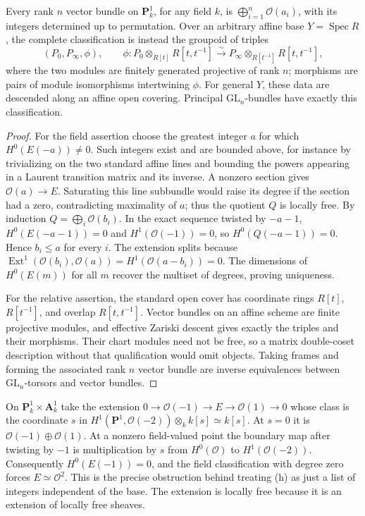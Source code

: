 \begin{theorem}
\label{geo-Kh}
Every rank $n$ vector bundle on $\mathbf P^1_k$, for any field $k$, is
$\bigoplus_{i=1}^n\mathcal O(a_i)$, with its integers determined up to
permutation. Over an arbitrary affine base $Y=\operatorname{Spec}R$,
the complete classification is instead the groupoid of triples
\[
 (P_0,P_\infty,\phi),\qquad
 \phi:P_0\otimes_{R[t]}R[t,t^{-1}]
 \xrightarrow{\sim}P_\infty\otimes_{R[t^{-1}]}R[t,t^{-1}],
\]
where the two modules are finitely generated projective of rank $n$;
morphisms are pairs of module isomorphisms intertwining $\phi$.
For general $Y$, these data are descended along an affine open covering.
Principal $\mathrm{GL}_n$-bundles have exactly this classification.
\end{theorem}
\begin{proof}
For the field assertion choose the greatest integer $a$ for which
$H^0(E(-a))\ne0$. Such integers exist and are bounded above, for instance
by trivializing on the two standard affine lines and bounding the powers
appearing in a Laurent transition matrix and its inverse. A nonzero
section gives $\mathcal O(a)\to E$. Saturating this line subbundle would
raise its degree if the section had a zero, contradicting maximality of
$a$; thus the quotient $Q$ is locally free. By induction
$Q=\bigoplus_i\mathcal O(b_i)$. In the exact sequence twisted by $-a-1$,
$H^0(E(-a-1))=0$ and $H^1(\mathcal O(-1))=0$, so
$H^0(Q(-a-1))=0$. Hence $b_i\leq a$ for every $i$.
The extension splits because
$\operatorname{Ext}^1(\mathcal O(b_i),\mathcal O(a))
=H^1(\mathcal O(a-b_i))=0$. The dimensions of $H^0(E(m))$ for all $m$
recover the multiset of degrees, proving uniqueness.

For the relative assertion, the standard open cover has coordinate rings
$R[t]$, $R[t^{-1}]$, and overlap $R[t,t^{-1}]$. Vector bundles on an affine
scheme are finite projective modules, and effective Zariski descent gives
exactly the triples and their morphisms. Their chart modules need not be
free, so a matrix double-coset description without that qualification would
omit objects. Taking frames and forming the associated rank $n$ vector
bundle are inverse equivalences between $\mathrm{GL}_n$-torsors and
vector bundles.
\end{proof}

\begin{example}
\label{geo-Kh-jump}
On $\mathbf P^1_k\times\mathbf A^1_k$ take the extension
$0\to\mathcal O(-1)\to E\to\mathcal O(1)\to0$
whose class is the coordinate $s$ in
$H^1(\mathbf P^1,\mathcal O(-2))\otimes_k k[s]\simeq k[s]$.
At $s=0$ it is $\mathcal O(-1)\oplus\mathcal O(1)$.
At a nonzero field-valued point the boundary map after twisting by $-1$
is multiplication by $s$ from $H^0(\mathcal O)$ to
$H^1(\mathcal O(-2))$. Consequently $H^0(E(-1))=0$, and the field
classification with degree zero forces $E\simeq\mathcal O^2$.
This is the precise obstruction behind treating (h) as just a list of
integers independent of the base. The extension is locally free because
it is an extension of locally free sheaves.
\end{example}

